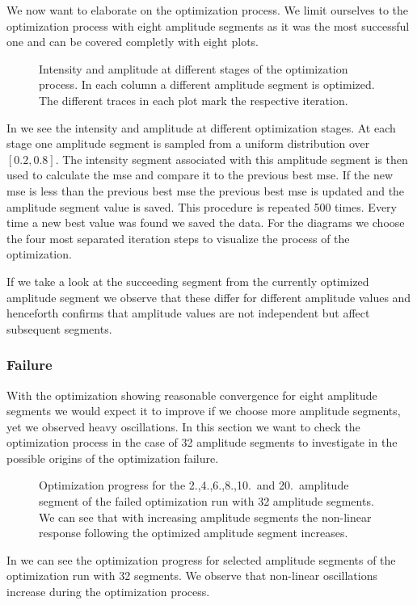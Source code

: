 We now want to elaborate on the optimization process. We limit ourselves to
the optimization process with eight amplitude segments as it was the most
successful one and can be covered completly with eight plots.
\begin{figure}[htb]
  \centering
  \begin{adjustbox}{width=\textwidth}
  \end{adjustbox}
  \caption{Intensity and amplitude at different stages of the optimization
    process. In each column a different amplitude segment is optimized.
    The different traces in each plot mark the respective iteration.
  }\label{fig:intensity_optimization_process}
\end{figure}
In  we see the intensity and
amplitude at different optimization stages. At each stage one amplitude
segment is sampled from a uniform distribution over $[0.2,0.8]$. The intensity
segment associated with this amplitude segment is then used to calculate
the \gls{mse} and compare it to the previous best \gls{mse}. If the new
\gls{mse} is less than the previous best \gls{mse} the previous best \gls{mse}
is updated and the amplitude segment value is saved. This procedure is
repeated \num{500} times. Every time a new best value was found we saved the
data. For the diagrams we choose the four most separated iteration steps to
visualize the process of the optimization.

If we take a look at the succeeding segment from the currently optimized
amplitude segment we observe that these differ for different amplitude
values and henceforth confirms that amplitude values are not independent but
affect subsequent segments.

\subsubsection{Failure}

With the optimization showing reasonable convergence for eight amplitude
segments we would expect it to improve if we choose more amplitude segments,
yet we observed heavy oscillations. In this section we want to check the
optimization process in the case of \num{32} amplitude segments to investigate
in the possible origins of the optimization failure.
\begin{figure}[htb]
  \centering
  \begin{adjustbox}{width=\textwidth}
  \end{adjustbox}
  \caption{Optimization progress for the 2.,4.,6.,8.,10.\ and 20.\ amplitude
    segment of the failed optimization run with 32 amplitude segments. We can
    see that with increasing amplitude segments the non-linear response
    following the optimized amplitude segment increases.
  }\label{fig:intensity_optimization_failure}
\end{figure}
In  we can see the optimization
progress for selected amplitude segments of the optimization run with 32
segments. We observe that non-linear oscillations increase during the
optimization process.

